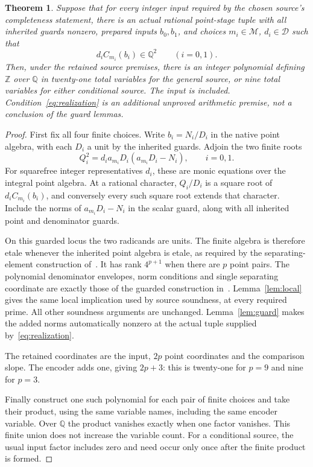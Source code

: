 \documentclass[11pt,a4paper]{article}
\newtheorem{theorem}{Theorem}[section]
\newcommand{\Q}{\mathbb Q}\newcommand{\Z}{\mathbb Z}
\begin{document}
\begin{theorem}\label{thm:reduction}
Suppose that for every integer input required by the chosen source's
completeness statement, there is an actual rational point-stage tuple
with all inherited guards nonzero, prepared inputs $b_0,b_1$, and choices
$m_i\in\mathcal M$, $d_i\in\mathcal D$ such that
\begin{equation}\label{eq:realization}
                         d_iC_{m_i}(b_i)\in\Q^2
                         \qquad(i=0,1).
\end{equation}
Then, under the retained source premises, there is an integer polynomial
defining $\Z$ over $\Q$ in twenty-one total variables for the general
source, or nine total variables for either conditional source. The input
is included. Condition~\eqref{eq:realization} is an additional unproved
arithmetic premise, not a conclusion of the guard lemmas.
\end{theorem}
\begin{proof}
First fix all four finite choices. Write $b_i=N_i/D_i$ in the native
point algebra, with each $D_i$ a unit by the inherited guards. Adjoin
the two finite roots
\begin{equation}\label{eq:roots}
 Q_i^2=d_i a_{m_i}D_i(a_{m_i}D_i-N_i),\qquad i=0,1.
\end{equation}
For squarefree integer representatives $d_i$, these are monic equations
over the integral point algebra. At a rational character, $Q_i/D_i$ is
a square root of $d_iC_{m_i}(b_i)$, and conversely every such square
root extends that character. Include the norms of
$a_{m_i}D_i-N_i$ in the scalar guard, along with all inherited point
and denominator guards.

On this guarded locus the two radicands are units. The finite algebra
is therefore etale whenever the inherited point algebra is etale, as
required by the separating-element construction of~\cite{UnitNorm}.
It has rank $4^{p+1}$ when there are $p$ point pairs. The polynomial
denominator envelopes, norm conditions and single separating coordinate
are exactly those of the guarded construction in~\cite{Complements}.
Lemma~\ref{lem:local} gives the same local implication used by source
soundness, at every required prime. All other soundness arguments are
unchanged. Lemma~\ref{lem:guard} makes the added norms automatically
nonzero at the actual tuple supplied by~\eqref{eq:realization}.

The retained coordinates are the input, $2p$ point coordinates and
the comparison slope. The encoder adds one, giving $2p+3$: this is
twenty-one for $p=9$ and nine for $p=3$.

Finally construct one such polynomial for each pair of finite choices
and take their product, using the same variable names, including the
same encoder variable. Over $\Q$ the product vanishes exactly when
one factor vanishes. This finite union does not increase the variable
count. For a conditional source, the usual input factor includes zero
and need occur only once after the finite product is formed.
\end{proof}
\end{document}
